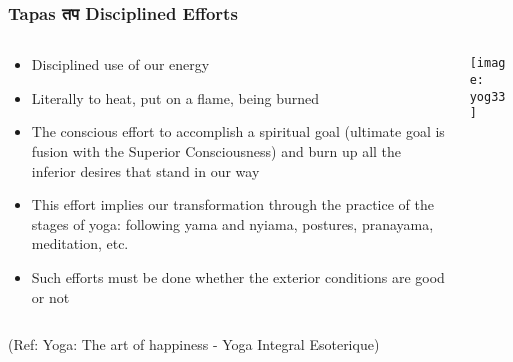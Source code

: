 \begin{frame}[fragile]\frametitle{Tapas तप   Disciplined Efforts}
   \begin{columns}
    \begin{column}[t]{0.7\linewidth}
	
	\begin{itemize}
	\item Disciplined use of our energy 
	\item Literally to heat, put on a flame, being burned
	\item The conscious effort to accomplish a spiritual goal (ultimate goal is fusion with the Superior Consciousness) and burn up all the inferior desires that stand in our way
	\item This effort implies our transformation through the practice of the stages of yoga: following yama and nyiama, postures, pranayama, meditation, etc.
	\item Such efforts must be done whether the exterior conditions are good or not
	\end{itemize}
	    \end{column}
    \begin{column}[t]{0.3\linewidth}
\begin{center}
\texttt{[image: yog33]}

\end{center}
    \end{column}
  \end{columns}
  
  \tiny{(Ref: Yoga: The art of happiness - Yoga Integral Esoterique)}

\end{frame}

